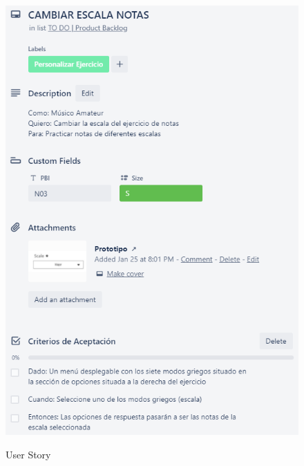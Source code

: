 \documentclass[12pt,twoside,titlepage]{report}
\begin{document}
\begin{figure}[H]
    \centering
    \includegraphics[scale=1.3]{Scrum/User Stories/NotasSelectorEscalas}
    \label{fig:NotasSelectorEscalas}
    \caption{User Story}
\end{figure}
\end{document}
